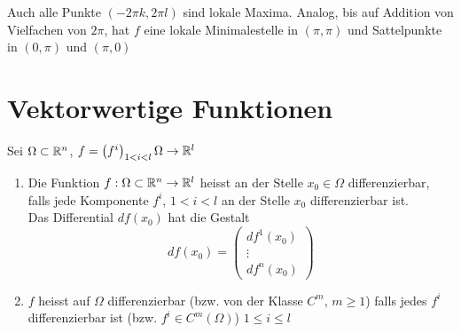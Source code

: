 \begin{enumerate}
Auch alle Punkte $\left( -2\pi k,2\pi l\right)$ sind lokale Maxima. Analog, bis auf Addition von Vielfachen von $2\pi$, hat $f$ eine lokale Minimalestelle in $\left( \pi,\pi\right)$ und Sattelpunkte in $\left( 0,\pi\right)$ und $\left( \pi,0\right)$
\end{enumerate}

\section{Vektorwertige Funktionen}
Sei $\Omega\subset\mathbb{R}^n$, $f=\left( f^i\right)_{1 < i < l}\Omega\to\mathbb{R}^l$
\begin{definition}{8.57}
\begin{enumerate}
\item Die Funktion $f:\Omega\subset\mathbb{R}^n\to\mathbb{R}^l$ heisst an der Stelle $x_0\in\Omega$ differenzierbar, falls jede Komponente $f^i$, $1 < i < l$ an der Stelle $x_0$ differenzierbar ist.\\

Das Differential $df\left( x_0\right)$ hat die Gestalt \[df\left( {{x_0}} \right) = \left( {\begin{array}{*{20}{c}}
{d{f^1}\left( {{x_0}} \right)}\\
{\vdots}\\
{d{f^n}\left( {{x_0}} \right)}
\end{array}} \right)\]
\item $f$ heisst auf $\Omega$ differenzierbar (bzw. von der Klasse $C^m$, $m\geq 1$) falls jedes $f^i$ differenzierbar ist (bzw. $f^i\in C^m\left( \Omega\right)$) $1\leq i \leq l$
\end{enumerate}
\end{definition}
